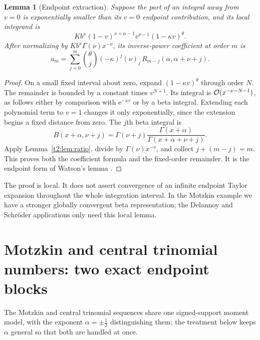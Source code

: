\documentclass[11pt,openany]{book}
\numberwithin{equation}{chapter}
\theoremstyle{plain}
\newtheorem{lemma}[theorem]{Lemma}
\theoremstyle{definition}
\theoremstyle{remark}
\newcommand{\ee}{\mathrm e}
\newcommand{\rising}[2]{(#1)_{#2}}
\begin{document}
\begin{lemma}[Endpoint extraction]
\label{t2:lem:endpoint}
Suppose the part of an integral away from $v=0$ is exponentially smaller than its $v=0$ endpoint contribution, and its local integrand is
\[
 Kb^x(1-v)^{x+\alpha-1}v^{\nu-1}(1-\kappa v)^\theta.
\]
After normalizing by $Kb^x\Gamma(\nu)x^{-\nu}$, its inverse-power coefficient at order $m$ is
\begin{equation}
 a_m=\sum_{j=0}^m\binom\theta j(-\kappa)^j
          \rising\nu j\,R_{m-j}(\alpha,\alpha+\nu+j).
 \label{t2:eq:endpoint-coeff}
\end{equation}
\end{lemma}
\begin{proof}
On a small fixed interval about zero, expand $(1-\kappa v)^\theta$ through order $N$. The remainder is bounded by a constant times $v^{N+1}$. Its integral is $\mathcal O(x^{-\nu-N-1})$, as follows either by comparison with $\ee^{-xv}$ or by a beta integral. Extending each polynomial term to $v=1$ changes it only exponentially, since the extension begins a fixed distance from zero. The $j$th beta integral is
\[
 B(x+\alpha,\nu+j)=\Gamma(\nu+j)
 \frac{\Gamma(x+\alpha)}{\Gamma(x+\alpha+\nu+j)}.
\]
Apply Lemma~\ref{t2:lem:ratio}, divide by $\Gamma(\nu)x^{-\nu}$, and collect $j+(m-j)=m$. This proves both the coefficient formula and the fixed-order remainder. It is the endpoint form of Watson's lemma \cite{dlmflaplace}.
\end{proof}

The proof is local. It does not assert convergence of an infinite endpoint Taylor expansion throughout the whole integration interval. In the Motzkin example we have a stronger globally convergent beta representation; the Delannoy and Schr\"oder applications only need this local lemma.

\section{Motzkin and central trinomial numbers: two exact endpoint blocks}
\label{ct:sec:motzkin}

The Motzkin and central trinomial sequences share one signed-support moment
model, with the exponent $\alpha=\pm\tfrac12$ distinguishing them; the
treatment below keeps $\alpha$ general so that both are handled at once.

\end{document}
